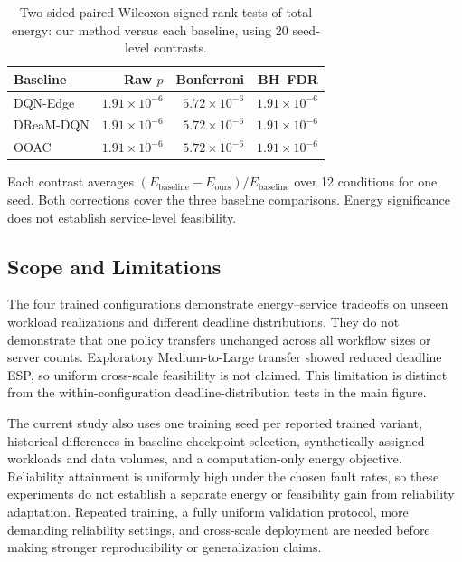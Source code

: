 \begin{table}[t]
\centering
\caption{Two-sided paired Wilcoxon signed-rank tests of total energy:
our method versus each baseline, using 20 seed-level contrasts.}
\label{tab:wilcoxon_energy}
\footnotesize
\setlength{\tabcolsep}{3.5pt}
\renewcommand{\arraystretch}{1.08}
\begin{tabular}{@{}lrrr@{}}
\toprule
Baseline & Raw $p$ & Bonferroni & BH--FDR \\
\midrule
DQN-Edge & $1.91\times10^{-6}$ & $5.72\times10^{-6}$ & $1.91\times10^{-6}$ \\
DReaM-DQN & $1.91\times10^{-6}$ & $5.72\times10^{-6}$ & $1.91\times10^{-6}$ \\
OOAC & $1.91\times10^{-6}$ & $5.72\times10^{-6}$ & $1.91\times10^{-6}$ \\
\bottomrule
\end{tabular}
\vspace{2pt}
\begin{minipage}{\columnwidth}
\footnotesize
Each contrast averages $(E_{\mathrm{baseline}}-E_{\mathrm{ours}})/
E_{\mathrm{baseline}}$ over 12 conditions for one seed. Both
corrections cover the three baseline comparisons. Energy significance
does not establish service-level feasibility.
\end{minipage}
\end{table}

\subsection{Scope and Limitations}
\label{subsec:experimental_limitations}

The four trained configurations demonstrate energy--service tradeoffs
on unseen workload realizations and different deadline distributions.
They do not demonstrate that one policy transfers unchanged across
all workflow sizes or server counts. Exploratory Medium-to-Large
transfer showed reduced deadline ESP, so uniform cross-scale
feasibility is not claimed. This limitation is distinct from the
within-configuration deadline-distribution tests in the main figure.

The current study also uses one training seed per reported trained
variant, historical differences in baseline checkpoint selection,
synthetically assigned workloads and data volumes, and a computation-only
energy objective. Reliability attainment is uniformly high under the
chosen fault rates, so these experiments do not establish a separate
energy or feasibility gain from reliability adaptation. Repeated
training, a fully uniform validation protocol, more demanding
reliability settings, and cross-scale deployment are needed before
making stronger reproducibility or generalization claims.
